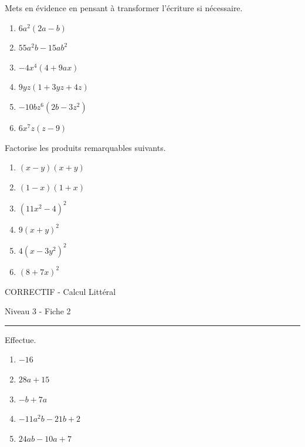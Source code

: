 \documentclass[12pt,parskip=half-, twoside=semi]{scrartcl}
\begin{document}
\begin{exercise}Mets en évidence en pensant à transformer l'écriture si nécessaire.
  \begin{enumerate}[cols=2]
      \item $6a^2(2a-b)$
      \item $55a^2b-15ab^2$
      \item $-4x^4(4+9ax)$
      \item $9yz(1+3yz+4z)$
      \item $-10bz^6(2b-3z^2)$
      \item $6x^7z(z-9)$
  \end{enumerate}
\end{exercise}

\begin{exercise}Factorise les produits remarquables suivants.
  \begin{enumerate}[cols=3]
    \item $(x-y)(x+y)$
    \item $(1-x)(1+x)$
    \item $(11x^2-4)^2$
    \item $9(x+y)^2$
    \item $4(x-3y^2)^2$
    \item $(8+7x)^2$
  \end{enumerate}
\end{exercise}

\begin{center}
  \bfseries
  \begin{Huge}
    CORRECTIF - Calcul Littéral
  \end{Huge}
  \smallbreak
  \begin{large}
    Niveau 3  - Fiche 2
  \end{large}
  \smallbreak
  \rule[10pt]{.5\linewidth}{1 pt}
\end{center}

\setcounter{exercise}{0}

\begin{exercise}Effectue.
  \begin{enumerate}[cols=2]
    \item $-16$
    \item $28a+15$
    \item $-b+7a$
    \item $-11a^2b-21b+2$
    \item $24ab-10a+7$
  \end{enumerate}
\end{exercise}
\end{document}
